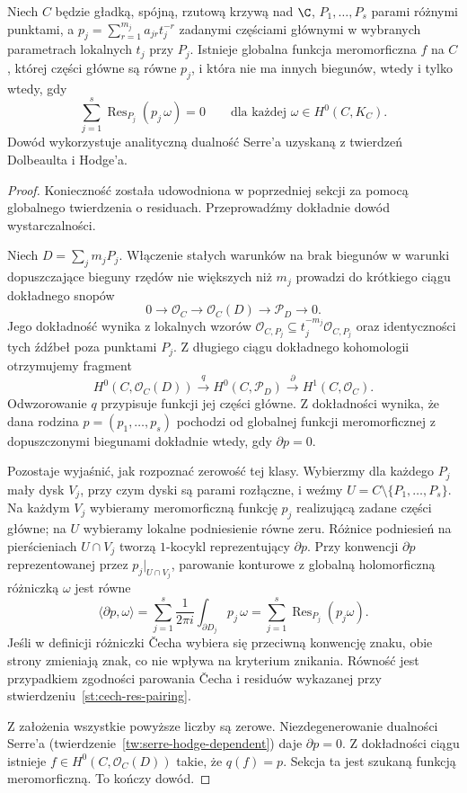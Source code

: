 \begin{twierdzenie}
\label{tw:mittag-curve}
Niech $C$ będzie gładką, spójną, rzutową krzywą
nad $\C$, $P_1,\ldots,P_s$ parami różnymi punktami,
a $p_j=\sum_{r=1}^{m_j}a_{jr}t_j^{-r}$
zadanymi częściami głównymi w wybranych parametrach
lokalnych $t_j$ przy $P_j$. Istnieje globalna
funkcja meromorficzna $f$ na $C$, której części
główne są równe $p_j$, i która nie ma innych
biegunów, wtedy i tylko wtedy, gdy
\[
  \sum_{j=1}^{s}\operatorname{Res}_{P_j}
       (p_j\,\omega)=0
  \qquad\text{dla każdej }\omega\in H^0(C,K_C).
\]
Dowód wykorzystuje analityczną dualność Serre'a
uzyskaną z twierdzeń Dolbeaulta i Hodge'a.
\end{twierdzenie}
\begin{proof}
Konieczność została udowodniona w poprzedniej
sekcji za pomocą globalnego twierdzenia o residuach.
Przeprowadźmy dokładnie dowód wystarczalności.

Niech $D=\sum_jm_jP_j$. Włączenie stałych warunków
na brak biegunów w warunki dopuszczające bieguny
rzędów nie większych niż $m_j$ prowadzi do krótkiego
ciągu dokładnego snopów
\[
 0\longrightarrow\mathcal O_C
 \longrightarrow\mathcal O_C(D)
 \longrightarrow\mathcal P_D\longrightarrow0.
\]
Jego dokładność wynika z lokalnych wzorów
$\mathcal O_{C,P_j}\subseteq
 t_j^{-m_j}\mathcal O_{C,P_j}$ oraz identyczności
tych źdźbeł poza punktami $P_j$.
Z długiego ciągu dokładnego kohomologii otrzymujemy
fragment
\[
 H^0(C,\mathcal O_C(D))\xrightarrow{\ q\ }
 H^0(C,\mathcal P_D)\xrightarrow{\ \partial\ }
 H^1(C,\mathcal O_C).
\]
Odwzorowanie $q$ przypisuje funkcji jej części główne.
Z dokładności wynika, że dana rodzina
$p=(p_1,\ldots,p_s)$ pochodzi od globalnej funkcji
meromorficznej z dopuszczonymi biegunami dokładnie wtedy,
gdy $\partial p=0$.

Pozostaje wyjaśnić, jak rozpoznać zerowość tej klasy.
Wybierzmy dla każdego $P_j$ mały dysk $V_j$, przy czym dyski są parami rozłączne, i weźmy
$U=C\setminus\{P_1,\ldots,P_s\}$. Na każdym
$V_j$ wybieramy meromorficzną funkcję $p_j$ realizującą
zadane części główne; na $U$ wybieramy lokalne podniesienie
równe zeru. Różnice podniesień na pierścieniach
$U\cap V_j$ tworzą $1$-kocykl reprezentujący
$\partial p$. Przy konwencji
$\partial p$ reprezentowanej przez $p_j|_{U\cap V_j}$,
parowanie konturowe z globalną holomorficzną różniczką
$\omega$ jest równe
\[
  \langle\partial p,\omega\rangle
  =\sum_{j=1}^s\frac1{2\pi i}
        \int_{\partial D_j}p_j\,\omega
  =\sum_{j=1}^s\operatorname{Res}_{P_j}(p_j\omega).
\]
Jeśli w definicji różniczki Čecha wybiera się
przeciwną konwencję znaku, obie strony zmieniają
znak, co nie wpływa na kryterium znikania.
Równość jest przypadkiem zgodności parowania
Čecha i residuów wykazanej przy
stwierdzeniu~\ref{st:cech-res-pairing}.

Z założenia wszystkie powyższe liczby są zerowe.
Niezdegenerowanie dualności Serre'a
(twierdzenie~\ref{tw:serre-hodge-dependent}) daje
$\partial p=0$. Z dokładności ciągu istnieje
$f\in H^0(C,\mathcal O_C(D))$ takie, że
$q(f)=p$. Sekcja ta jest szukaną funkcją
meromorficzną. To kończy dowód.
\end{proof}

